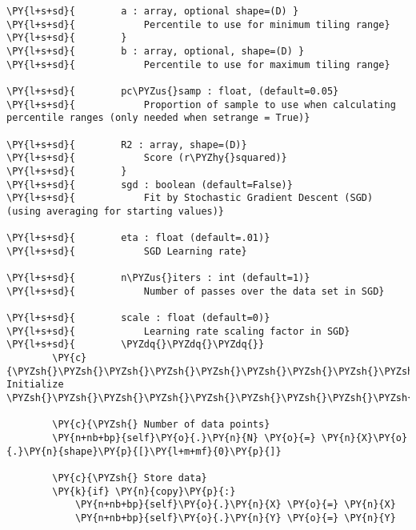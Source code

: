 \begin{Verbatim}[commandchars=\\\{\}]
\PY{l+s+sd}{        a : array, optional shape=(D) }
\PY{l+s+sd}{            Percentile to use for minimum tiling range}
\PY{l+s+sd}{        }
\PY{l+s+sd}{        b : array, optional, shape=(D) }
\PY{l+s+sd}{            Percentile to use for maximum tiling range}

\PY{l+s+sd}{        pc\PYZus{}samp : float, (default=0.05}
\PY{l+s+sd}{            Proportion of sample to use when calculating percentile ranges (only needed when setrange = True)}

\PY{l+s+sd}{        R2 : array, shape=(D)}
\PY{l+s+sd}{            Score (r\PYZhy{}squared)}
\PY{l+s+sd}{        }
\PY{l+s+sd}{        sgd : boolean (default=False)}
\PY{l+s+sd}{            Fit by Stochastic Gradient Descent (SGD) (using averaging for starting values)}

\PY{l+s+sd}{        eta : float (default=.01)}
\PY{l+s+sd}{            SGD Learning rate}

\PY{l+s+sd}{        n\PYZus{}iters : int (default=1)}
\PY{l+s+sd}{            Number of passes over the data set in SGD}

\PY{l+s+sd}{        scale : float (default=0)}
\PY{l+s+sd}{            Learning rate scaling factor in SGD}
\PY{l+s+sd}{        \PYZdq{}\PYZdq{}\PYZdq{}}
        \PY{c}{\PYZsh{}\PYZsh{}\PYZsh{}\PYZsh{}\PYZsh{}\PYZsh{}\PYZsh{}\PYZsh{}\PYZsh{}\PYZsh{}\PYZsh{}\PYZsh{}\PYZsh{}\PYZsh{}\PYZsh{}\PYZsh{}\PYZsh{}\PYZsh{}      Initialize      \PYZsh{}\PYZsh{}\PYZsh{}\PYZsh{}\PYZsh{}\PYZsh{}\PYZsh{}\PYZsh{}\PYZsh{}\PYZsh{}\PYZsh{}\PYZsh{}\PYZsh{}\PYZsh{}\PYZsh{}\PYZsh{}\PYZsh{}\PYZsh{}\PYZsh{}\PYZsh{}}

        \PY{c}{\PYZsh{} Number of data points}
        \PY{n+nb+bp}{self}\PY{o}{.}\PY{n}{N} \PY{o}{=} \PY{n}{X}\PY{o}{.}\PY{n}{shape}\PY{p}{[}\PY{l+m+mf}{0}\PY{p}{]}

        \PY{c}{\PYZsh{} Store data}
        \PY{k}{if} \PY{n}{copy}\PY{p}{:}
            \PY{n+nb+bp}{self}\PY{o}{.}\PY{n}{X} \PY{o}{=} \PY{n}{X} 
            \PY{n+nb+bp}{self}\PY{o}{.}\PY{n}{Y} \PY{o}{=} \PY{n}{Y}


\end{Verbatim}
